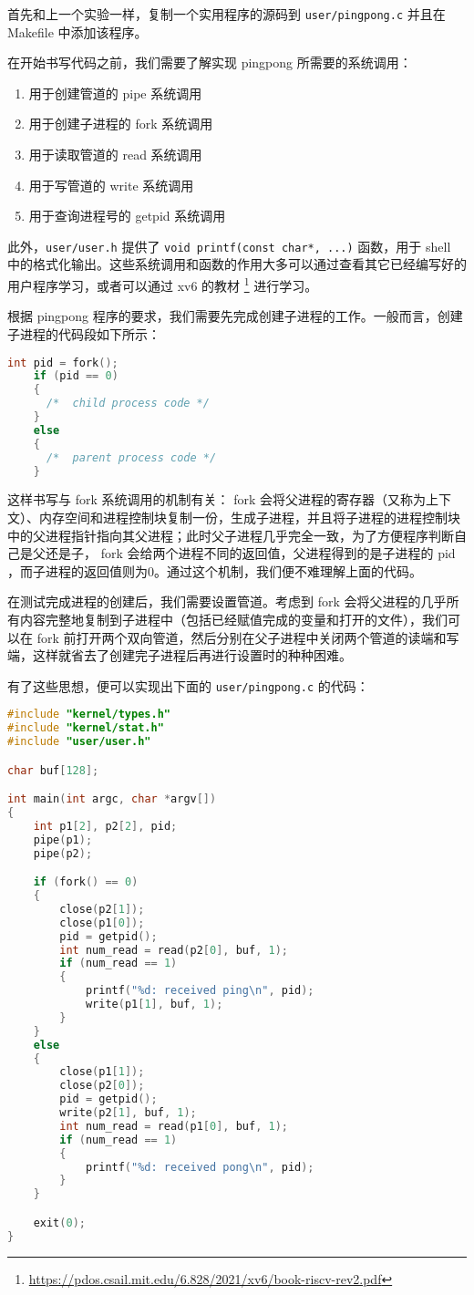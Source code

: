首先和上一个实验一样，复制一个实用程序的源码到 \lstinline{user/pingpong.c} 并且在 Makefile 中添加该程序。

在开始书写代码之前，我们需要了解实现 pingpong 所需要的系统调用：
\begin{enumerate}
  \item 用于创建管道的 pipe 系统调用
  \item 用于创建子进程的 fork 系统调用
  \item 用于读取管道的 read 系统调用
  \item 用于写管道的 write 系统调用
  \item 用于查询进程号的 getpid 系统调用
\end{enumerate}
此外，\lstinline{user/user.h} 提供了 \lstinline{void printf(const char*, ...)} 函数，用于 shell 中的格式化输出。这些系统调用和函数的作用大多可以通过查看其它已经编写好的用户程序学习，或者可以通过 xv6 的教材 \footnote{\url{https://pdos.csail.mit.edu/6.828/2021/xv6/book-riscv-rev2.pdf}} 进行学习。

根据 pingpong 程序的要求，我们需要先完成创建子进程的工作。一般而言，创建子进程的代码段如下所示：
\begin{lstlisting}[language=C]
    int pid = fork();
    if (pid == 0)
    {
      /*  child process code */
    }
    else
    {
      /*  parent process code */
    }
\end{lstlisting}

这样书写与 fork 系统调用的机制有关： fork 会将父进程的寄存器（又称为上下文）、内存空间和进程控制块复制一份，生成子进程，并且将子进程的进程控制块中的父进程指针指向其父进程；此时父子进程几乎完全一致，为了方便程序判断自己是父还是子， fork 会给两个进程不同的返回值，父进程得到的是子进程的 pid ，而子进程的返回值则为0。通过这个机制，我们便不难理解上面的代码。

在测试完成进程的创建后，我们需要设置管道。考虑到 fork 会将父进程的几乎所有内容完整地复制到子进程中（包括已经赋值完成的变量和打开的文件），我们可以在 fork 前打开两个双向管道，然后分别在父子进程中关闭两个管道的读端和写端，这样就省去了创建完子进程后再进行设置时的种种困难。

有了这些思想，便可以实现出下面的 \lstinline{user/pingpong.c} 的代码：
\begin{lstlisting}[language=C]
#include "kernel/types.h"
#include "kernel/stat.h"
#include "user/user.h"

char buf[128];

int main(int argc, char *argv[])
{
    int p1[2], p2[2], pid;
    pipe(p1);
    pipe(p2);

    if (fork() == 0)
    {
        close(p2[1]);
        close(p1[0]);
        pid = getpid();
        int num_read = read(p2[0], buf, 1);
        if (num_read == 1)
        {
            printf("%d: received ping\n", pid);
            write(p1[1], buf, 1);
        }
    }
    else
    {
        close(p1[1]);
        close(p2[0]);
        pid = getpid();
        write(p2[1], buf, 1);
        int num_read = read(p1[0], buf, 1);
        if (num_read == 1)
        {
            printf("%d: received pong\n", pid);
        }
    }

    exit(0);
}
\end{lstlisting}

